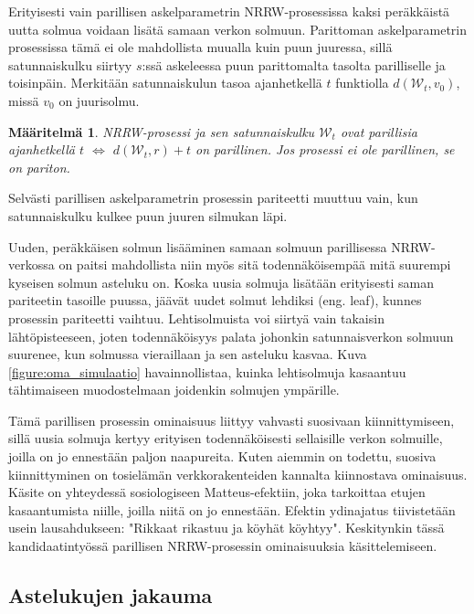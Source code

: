 \documentclass[finnish, 12pt, a4paper, sci, utf8, pdfa]{aaltothesis}
\newcommand{\Wrandom}{\mathcal{W}}
\newtheorem{definition}{Määritelmä}
\begin{document}
Erityisesti vain parillisen askelparametrin NRRW-prosessissa kaksi peräkkäistä uutta solmua voidaan lisätä samaan verkon solmuun. Parittoman askelparametrin prosessissa tämä ei ole mahdollista muualla kuin puun juuressa, sillä satunnaiskulku siirtyy $ s $:ssä askeleessa puun parittomalta tasolta parilliselle ja toisinpäin. Merkitään satunnaiskulun tasoa ajanhetkellä $ t $ funktiolla $ d(\Wrandom_{t}, v_{0}) $, missä $ v_{0} $ on juurisolmu.
\begin{definition}
NRRW-prosessi ja sen satunnaiskulku $ \Wrandom_{t} $ ovat parillisia ajanhetkellä $ t $ $ \Leftrightarrow $ $ d(\Wrandom_{t}, r) + t $ on parillinen. Jos prosessi ei ole parillinen, se on pariton.
\label{definition:parity}
\end{definition}
Selvästi parillisen askelparametrin prosessin pariteetti muuttuu vain, kun satunnaiskulku kulkee puun juuren silmukan läpi.

Uuden, peräkkäisen solmun lisääminen samaan solmuun parillisessa NRRW-verkossa on paitsi mahdollista niin myös sitä todennäköisempää mitä suurempi kyseisen solmun asteluku on. Koska uusia solmuja lisätään erityisesti saman pariteetin tasoille puussa, jäävät uudet solmut lehdiksi (eng. leaf), kunnes prosessin pariteetti vaihtuu. Lehtisolmuista voi siirtyä vain takaisin lähtöpisteeseen, joten todennäköisyys palata johonkin satunnaisverkon solmuun suurenee, kun solmussa vieraillaan ja sen asteluku kasvaa. Kuva \ref{figure:oma_simulaatio} havainnollistaa, kuinka lehtisolmuja kasaantuu tähtimaiseen muodostelmaan joidenkin solmujen ympärille.

Tämä parillisen prosessin ominaisuus liittyy vahvasti suosivaan kiinnittymiseen, sillä uusia solmuja kertyy erityisen todennäköisesti sellaisille verkon solmuille, joilla on jo ennestään paljon naapureita. Kuten aiemmin on todettu, suosiva kiinnittyminen on tosielämän verkkorakenteiden kannalta kiinnostava ominaisuus. Käsite on yhteydessä sosiologiseen Matteus-efektiin, joka tarkoittaa etujen kasaantumista niille, joilla niitä on jo ennestään. Efektin ydinajatus tiivistetään usein lausahdukseen: "Rikkaat rikastuu ja köyhät köyhtyy". Keskitynkin tässä kandidaatintyössä parillisen NRRW-prosessin ominaisuuksia käsittelemiseen.

\subsection{Astelukujen jakauma}
\end{document}
